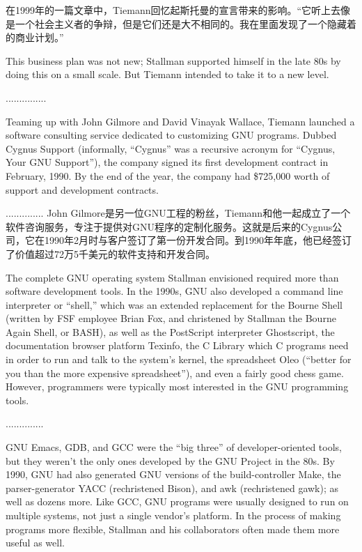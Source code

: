 \ifdefined\chs
在1999年的一篇文章中，Tiemann回忆起斯托曼的宣言带来的影响。“它听上去像是一个社会主义者的争辩，但是它们还是大不相同的。我在里面发现了一个隐藏着的商业计划。” 
\fi

\ifdefined\eng
This business plan was not new; Stallman supported himself in the late 80s by doing this on a small scale.  But Tiemann intended to take it to a new level.
\fi

\ifdefined\chs
...............
\fi

\ifdefined\eng
Teaming up with John Gilmore and David Vinayak Wallace, Tiemann launched a software consulting service dedicated to customizing GNU programs. Dubbed Cygnus Support (informally, ``Cygnus'' was a recursive acronym for ``Cygnus, Your GNU Support''), the company signed its first development contract in February, 1990. By the end of the year, the company had \$725,000 worth of support and development contracts.
\fi

\ifdefined\chs
..............
John Gilmore是另一位GNU工程的粉丝，Tiemann和他一起成立了一个软件咨询服务，专注于提供对GNU程序的定制化服务。这就是后来的Cygnus公司，它在1990年2月时与客户签订了第一份开发合同。到1990年年底，他已经签订了价值超过72万5千美元的软件支持和开发合同。
\fi

\ifdefined\eng
The complete GNU operating system Stallman envisioned required more than software development tools.  In the 1990s, GNU also developed a command line interpreter or ``shell,'' which was an extended replacement for the Bourne Shell (written by FSF employee Brian Fox, and christened by Stallman the Bourne Again Shell, or BASH), as well as the PostScript interpreter Ghostscript, the documentation browser platform Texinfo, the C Library which C programs need in order to run and talk to the system's kernel, the spreadsheet Oleo (``better for you than the more expensive spreadsheet''), and even a fairly good chess game.  However, programmers were typically most interested in the GNU programming tools.
\fi

\ifdefined\chs
..............
\fi

\ifdefined\eng
GNU Emacs, GDB, and GCC were the ``big three'' of developer-oriented tools, but they weren't the only ones developed by the GNU Project in the 80s. By 1990, GNU had also generated GNU versions of the build-controller Make, the parser-generator YACC (rechristened Bison), and awk (rechristened gawk); as well as dozens more. Like GCC, GNU programs were usually designed to run on multiple systems, not just a single vendor's platform. In the process of making programs more flexible, Stallman and his collaborators often made them more useful as well.
\fi

